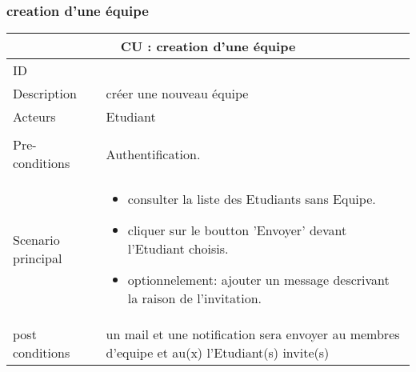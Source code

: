 \documentclass[11pt,fleqn]{book} %
\begin{document}
\subsubsection{creation  d'une équipe}
\begin{center}
\begin{tabularx}{1\textwidth} { | p{4cm} | >{\raggedright\arraybackslash}X |  }
  \hline
  \multicolumn{2}{|c|}{CU : creation  d'une équipe} \\
 \hline
 ID & 1  \\
 \hline
 Description  & créer une nouveau équipe  \\
  \hline
 Acteurs  & Etudiant \\
  \hline   \\
 Pre-conditions  & Authentification.  \\
  \hline
 Scenario principal  & 
 \begin{itemize}
     \item  consulter la liste des Etudiants sans Equipe.
     \item cliquer sur le boutton ’Envoyer’ devant l’Etudiant choisis.
     \item optionnelement: ajouter un message descrivant la raison de l’invitation.
 \end{itemize}\\
  \hline
 post conditions  &  un mail et une notification sera envoyer au membres d’equipe et au(x) l’Etudiant(s) invite(s)  \\
  \hline
\end{tabularx}
\label{tbl:nicetablelesstable}
\end{center}
\end{document}
